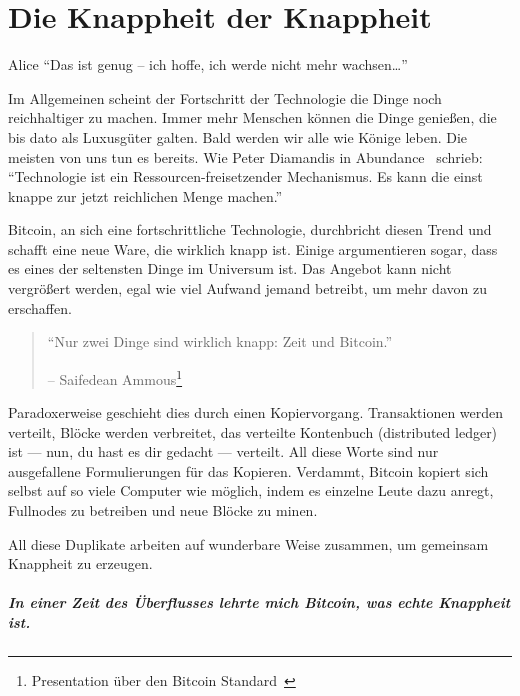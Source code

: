 \chapter{Die Knappheit der Knappheit}
\label{les:2}

\begin{chapquote}{Alice}
\enquote{Das ist genug – ich hoffe, ich werde nicht mehr wachsen\ldots}
\end{chapquote}

Im Allgemeinen scheint der Fortschritt der Technologie die Dinge noch
reichhaltiger zu machen. Immer mehr Menschen können die Dinge genießen, die bis
dato als Luxusgüter galten. Bald werden wir alle wie Könige leben. Die meisten
von uns tun es bereits. Wie Peter Diamandis in Abundance~\cite{abundance}
schrieb: \enquote{Technologie ist ein Ressourcen-freisetzender Mechanismus. Es
kann die einst knappe zur jetzt reichlichen Menge machen.}

Bitcoin, an sich eine fortschrittliche Technologie, durchbricht diesen Trend und
schafft eine neue Ware, die wirklich knapp ist. Einige argumentieren sogar, dass
es eines der seltensten Dinge im Universum ist. Das Angebot kann nicht
vergrößert werden, egal wie viel Aufwand jemand betreibt, um mehr davon zu
erschaffen.

\begin{quotation}\begin{samepage}
\enquote{Nur zwei Dinge sind wirklich knapp: Zeit und Bitcoin.}
\begin{flushright} -- Saifedean Ammous\footnote{Presentation über den Bitcoin
Standard~\cite{bitcoinstandard-pres}}
\end{flushright}\end{samepage}\end{quotation}

Paradoxerweise geschieht dies durch einen Kopiervorgang. Transaktionen werden
verteilt, Blöcke werden verbreitet, das verteilte Kontenbuch (distributed
ledger) ist --- nun, du hast es dir gedacht --- verteilt. All diese Worte sind
nur ausgefallene Formulierungen für das Kopieren. Verdammt, Bitcoin kopiert sich
selbst auf so viele Computer wie möglich, indem es einzelne Leute dazu anregt,
Fullnodes zu betreiben und neue Blöcke zu minen.

All diese Duplikate arbeiten auf wunderbare Weise zusammen, um gemeinsam
Knappheit zu erzeugen.

\paragraph{In einer Zeit des Überflusses lehrte mich Bitcoin, was echte
Knappheit ist.}

